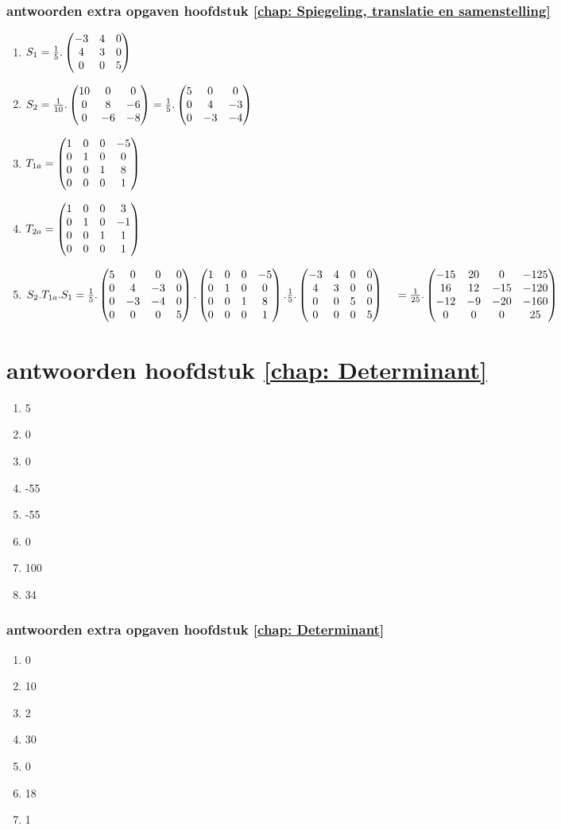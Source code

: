 \subsubsection{antwoorden extra opgaven hoofdstuk \ref{chap: Spiegeling, translatie en samenstelling}}
\begin{enumerate}
	\item $   S_1 = \frac{1}{5} .\begin{pmatrix} -3&4&0 \\ 4&3&0 \\ 0&0&5 \end{pmatrix}  $ 
	\item $   S_2 = \frac{1}{10} .\begin{pmatrix} 10&0&0 \\ 0&8&-6 \\ 0&-6&-8 \end{pmatrix}  
	= \frac{1}{5} .\begin{pmatrix} 5&0&0 \\ 0&4&-3 \\ 0&-3&-4 \end{pmatrix}  $ 
	
	\item $ T_{1a} = \begin{pmatrix} 1&0&0&-5 \\ 0&1&0&0 \\ 0&0&1&8 \\ 0&0&0&1 \end{pmatrix} $
	\item $ T_{2a} = \begin{pmatrix} 1&0&0&3 \\ 0&1&0&-1 \\ 0&0&1&1 \\ 0&0&0&1 \end{pmatrix} $
	\item $ S_2 . T_{1a} . S_1 = \frac{1}{5} .\begin{pmatrix} 5&0&0&0 \\ 0&4&-3&0 \\ 0&-3&-4&0 \\ 0&0&0&5 \end{pmatrix} . 
	\begin{pmatrix} 1&0&0&-5 \\ 0&1&0&0 \\ 0&0&1&8 \\ 0&0&0&1 \end{pmatrix} . 
	\frac{1}{5} .	\begin{pmatrix} -3&4&0&0 \\ 4&3&0&0 \\ 0&0&5&0 \\ 0&0&0&5 \end{pmatrix} \\
	\quad	= \frac{1}{25} .	\begin{pmatrix} -15&20&0&-125 \\ 16&12&-15&-120 \\ -12&-9&-20&-160 \\ 0&0&0&25 \end{pmatrix} 
	$
	
\end{enumerate}

\section{antwoorden  hoofdstuk \ref{chap: Determinant}}
\begin{enumerate}[label=\Alph*]
	\item 5
	\item 0
	\item 0
	\item -55
	\item -55
	\item 0
	\item 100
	\item 34
\end{enumerate}
\subsubsection{antwoorden extra opgaven hoofdstuk \ref{chap: Determinant}}
\begin{enumerate}[label=\Alph*]
	\item 0
	\item 10
	\item 2
	\item 30
	\item 0
	\item 18
	\item 1
\end{enumerate}
